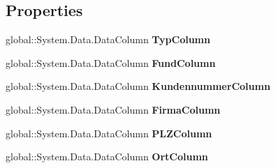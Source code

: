 \subsection*{Properties}
\begin{DoxyCompactItemize}
\item 
global\+::\+System.\+Data.\+Data\+Column {\bfseries Typ\+Column}\hypertarget{class_products_1_1_data_1_1ds_sage_1_1_suchkunde_data_table_a04eced9019f7c5423f8a0d8d5444e95e}{}\label{class_products_1_1_data_1_1ds_sage_1_1_suchkunde_data_table_a04eced9019f7c5423f8a0d8d5444e95e}

\item 
global\+::\+System.\+Data.\+Data\+Column {\bfseries Fund\+Column}\hypertarget{class_products_1_1_data_1_1ds_sage_1_1_suchkunde_data_table_a1acd475ad1c01944eb6c7b6721d1b222}{}\label{class_products_1_1_data_1_1ds_sage_1_1_suchkunde_data_table_a1acd475ad1c01944eb6c7b6721d1b222}

\item 
global\+::\+System.\+Data.\+Data\+Column {\bfseries Kundennummer\+Column}\hypertarget{class_products_1_1_data_1_1ds_sage_1_1_suchkunde_data_table_aab01ec1a764b0a8d25179809918eb862}{}\label{class_products_1_1_data_1_1ds_sage_1_1_suchkunde_data_table_aab01ec1a764b0a8d25179809918eb862}

\item 
global\+::\+System.\+Data.\+Data\+Column {\bfseries Firma\+Column}\hypertarget{class_products_1_1_data_1_1ds_sage_1_1_suchkunde_data_table_aa8f3aff64feede17218193fca6703e86}{}\label{class_products_1_1_data_1_1ds_sage_1_1_suchkunde_data_table_aa8f3aff64feede17218193fca6703e86}

\item 
global\+::\+System.\+Data.\+Data\+Column {\bfseries P\+L\+Z\+Column}\hypertarget{class_products_1_1_data_1_1ds_sage_1_1_suchkunde_data_table_adfcb8a0fe1b5758f8eae26821d0d100d}{}\label{class_products_1_1_data_1_1ds_sage_1_1_suchkunde_data_table_adfcb8a0fe1b5758f8eae26821d0d100d}

\item 
global\+::\+System.\+Data.\+Data\+Column {\bfseries Ort\+Column}\hypertarget{class_products_1_1_data_1_1ds_sage_1_1_suchkunde_data_table_aaf74cecdd84831a49ac6f9de8551b2f3}{}\label{class_products_1_1_data_1_1ds_sage_1_1_suchkunde_data_table_aaf74cecdd84831a49ac6f9de8551b2f3}


\end{DoxyCompactItemize}
